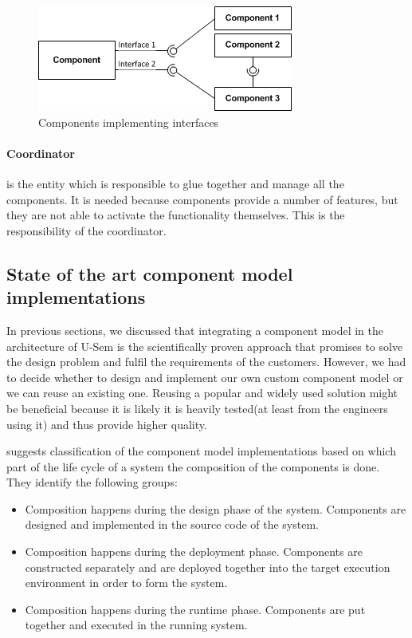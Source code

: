 	\begin{figure}[h!]
  		\centering
  		\includegraphics[scale=0.75]{plug-in/component-services.png}
  		\caption{Components implementing interfaces }
  		\label{fig_comp}
	\end{figure}

\paragraph{Coordinator}
	is the entity which is responsible to glue together and manage all the components. It is needed because components provide a number of features, but they are not able to activate the functionality themselves. This is the responsibility of the coordinator.

\subsection{State of the art component model implementations}

In previous sections, we discussed that integrating a component model in the architecture of U-Sem is the scientifically proven approach that promises to solve the design problem and fulfil the requirements of the customers. However, we had to decide whether to design and implement our own custom component model or we can reuse an existing one. Reusing a popular and widely used solution might be beneficial because it is likely it is heavily tested(at least from the engineers using it) and thus provide higher quality. 

\cite{Lau} suggests classification of the component model implementations based on which part of the life cycle of a system the composition of the components is done. They identify the following groups:

\begin{itemize}
	\item  Composition happens during the design phase of the system. Components are designed and implemented in the source code of the system.
	\item  Composition happens during the deployment phase. Components are constructed separately and are deployed together into the target execution environment in order to form the system.
	\item Composition happens during the runtime phase. Components are put together and executed in the running system.
\end{itemize}

